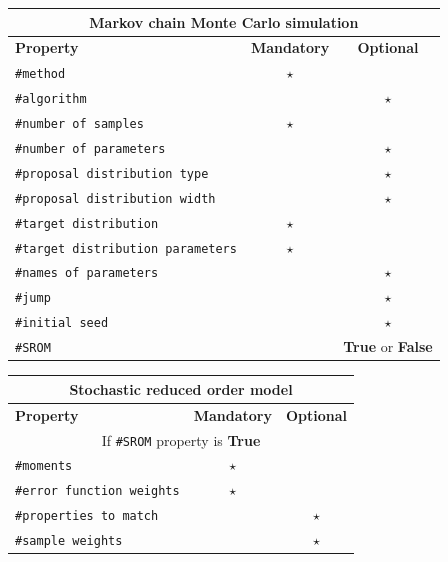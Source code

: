 \documentclass[preprint,12pt]{elsarticle}
\begin{document}
\begin{center}
	\begin{tabular}{ |l|c|c| } 
				\hline
		\multicolumn{3}{|c|}{\textbf{Markov chain Monte Carlo simulation}} \\
		\hline
		\textbf{Property} & \textbf{Mandatory} & \textbf{Optional} \\
		\hline
		\texttt{\#method} & $\star$ &   \\ 
		\hline
		\texttt{\#algorithm}& & $\star$   \\ 
		\hline
		\texttt{\#number of samples}& $\star$ &   \\ 
		\hline
		\texttt{\#number of parameters}& &  $\star$  \\ 
		\hline
		\texttt{\#proposal distribution type}  &  & $\star$  \\ 
		\hline
		\texttt{\#proposal distribution width}   & &  $\star$  \\ 
		\hline
		\texttt{\#target distribution}  & $\star$ &   \\ 
		\hline
		\texttt{\#target distribution parameters}  & $\star$ &   \\ 
		\hline
		\texttt{\#names of parameters} & & $\star$   \\ 
		\hline
		\texttt{\#jump} & & $\star$   \\ 
		\hline
		\texttt{\#initial seed} & & $\star$   \\ 
		\hline
		\texttt{\#SROM}&  & \textbf{True} or \textbf{False}    \\ 
		\hline
	\end{tabular}
\end{center}

\begin{center}
	\begin{tabular}{ |l|c|c| } 
		\hline
		\multicolumn{3}{|c|}{\textbf{Stochastic reduced order model}} \\
		\hline
		\textbf{Property} & \textbf{Mandatory} & \textbf{Optional} \\
		\hline
		\multicolumn{3}{|c|}{If \texttt{\#SROM} property is \textbf{True}} \\
		\hline
		\texttt{\#moments}& $\star$ &   \\ 
		\hline
		\texttt{\#error function weights} & $\star$ &   \\ 
		\hline
		\texttt{\#properties to match}&  &  $\star$  \\ 
		\hline
		\texttt{\#sample weights}& & $\star$   \\ 
		\hline
	\end{tabular}
\end{center}
\end{document}
